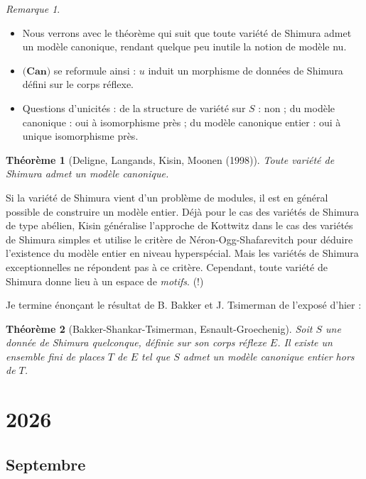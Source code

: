 \documentclass[11.8pt]{amsart}
\theoremstyle{plain}
\newtheorem{thm}{Théorème}[section]
\theoremstyle{definition}
\theoremstyle{remark}
\newtheorem*{rmq}{Remarque}
\begin{document}
\begin{enumerate}
\begin{rmq} \begin{itemize}
\item Nous verrons avec le théorème qui suit que toute variété de Shimura admet un modèle canonique, rendant quelque peu inutile la notion de modèle nu. 
\item $\textbf{(Can)}$ se reformule ainsi : $u$ induit un morphisme de données de Shimura défini sur le corps réflexe.  
\item Questions d'unicités : de la structure de variété sur $S$ : non ; du modèle canonique : oui à isomorphisme près ; du modèle canonique entier : oui à unique isomorphisme près.
\end{itemize}\end{rmq}

\begin{thm}[Deligne, Langands, Kisin, Moonen (1998)] Toute variété de Shimura admet un modèle canonique.\end{thm}

 Si la variété de Shimura vient d'un problème de modules, il est en général possible de construire un modèle entier. Déjà pour le cas des variétés de Shimura de type abélien, Kisin généralise l'approche de Kottwitz dans le cas des variétés de Shimura simples et utilise le critère de Néron-Ogg-Shafarevitch pour déduire l'existence du modèle entier en niveau hyperspécial. Mais les variétés de Shimura exceptionnelles ne répondent pas à ce critère. Cependant, toute variété de Shimura donne lieu à un espace de \textit{motifs}. (!)

Je termine énonçant le résultat de B. Bakker et J. Tsimerman de l'exposé d'hier :  
\begin{thm}[Bakker-Shankar-Tsimerman, Esnault-Groechenig] Soit $S$ une donnée de Shimura quelconque, définie sur son corps réflexe $E$. Il existe un ensemble fini de places $T$ de $E$ tel que $S$ admet un modèle canonique entier hors de $T$.
\end{thm}

\end{enumerate}

\newpage

\section{2026}

\subsection{Septembre}
\vspace{10pt}
\end{document}
